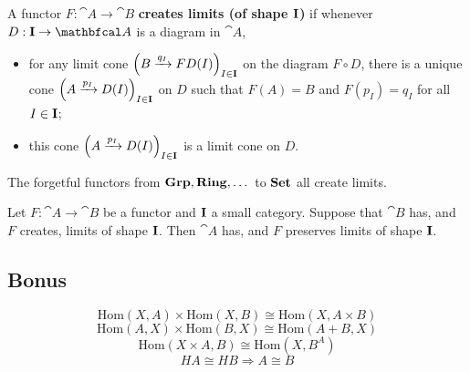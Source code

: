 \documentclass[11pt,a4paper]{article}
\begin{document}
\begin{definition}
    A functor $F:\cat{A}\to\cat{B}$ \textbf{creates limits (of shape $\mathbf{I}$)} if whenever $D:\bcat{I}\to\cat{A}$ is a diagram in $\cat{A}$,
    \begin{itemize}
        \item for any limit cone $\Big( B\xrightarrow{q_I} FD(I) \Big)_{I\in\mathbf{I}}$ on the diagram $F\circ D$, there is a unique cone $\Big( A\xrightarrow{p_I} D(I) \Big)_{I\in\mathbf{I}}$ on $D$ such that $F(A)=B$ and $F(p_I)=q_I$ for all $I\in\mathbf{I}$;
        \item this cone $\Big( A\xrightarrow{p_I} D(I) \Big)_{I\in\mathbf{I}}$ is a limit cone on $D$.
    \end{itemize}
\end{definition}

The forgetful functors from $\mathbf{Grp}, \mathbf{Ring},\dots$ to $\mathbf{Set}$ all create limits.

\begin{lemma}
    Let $F:\cat{A}\to\cat{B}$ be a functor and $\mathbf{I}$ a small category. Suppose that $\cat{B}$ has, and $F$ creates, limits of shape $\mathbf{I}$. Then $\cat{A}$ has, and $F$ preserves limits of shape $\mathbf{I}$.
\end{lemma}

\subsection{Bonus}
\begin{equation*}
    \text{Hom}(X,A)\times\text{Hom}(X,B)\cong\text{Hom}(X,A\times B)
\end{equation*}
\begin{equation*}
    \text{Hom}(A,X)\times\text{Hom}(B,X)\cong\text{Hom}(A+B, X)
\end{equation*}
\begin{equation*}
    \text{Hom}(X\times A,B)\cong\text{Hom}(X,B^A)
\end{equation*}
\begin{equation*}
    HA\cong HB \Rightarrow A\cong B
\end{equation*}
\end{document}
